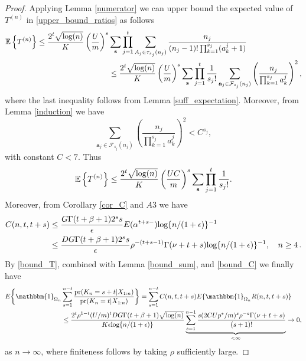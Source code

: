 \documentclass[12pt]{article}
\def\log{\hbox{log}}
\begin{document}
\begin{proof}
Applying Lemma \ref{numerator} we can upper bound the expected value of $T^{(n)}$ in \eqref{upper_bound_ratios} as follows
\[
\begin{aligned}
\mathbb{E}\left\{T^{(n)}\right\} \leq \frac{2^t\sqrt{\log(n)}}{K}\left(\frac{U}{m}\right)^s&\sum_{\textbf{s}}\prod_{j = 1}^t\sum_{A_j \in \tau_{s_j}(n_j)}\frac{n_j}{(n_j-1)!\prod_{k = 1}^{s_j}(a^j_k+1)}\\
& \leq \frac{2^t\sqrt{\log(n)}}{K}\left(\frac{U}{m}\right)^s\sum_{\textbf{s}}\prod_{j = 1}^t\frac{1}{s_j!}\sum_{\textbf{a}_j \in \mathcal{F}_{s_j}(n_j)}\left(\frac{n_j}{\prod_{k = 1}^{s_j}a^j_k}\right)^2,
\end{aligned}
\]
where the last inequality follows from Lemma \ref{suff_expectation}. Moreover, from Lemma \ref{induction} we have
\[
\sum_{\textbf{a}_j \in \mathcal{F}_{s_j}(n_j)}\left(\frac{n_j}{\prod_{k = 1}^{s_j}a^j_k}\right)^2 < C^{s_j},
\]
with constant $C < 7$. Thus
\begin{equation}\label{bound_T}
\mathbb{E}\left\{T^{(n)}\right\} \leq \frac{2^t\sqrt{\log(n)}}{K}\left(\frac{UC}{m}\right)^s\sum_{\textbf{s}}\prod_{j = 1}^t\frac{1}{s_j!}.
\end{equation}
Moreover, from Corollary \ref{cor_C} and $A3$ we have
\begin{equation}\label{bound_C}
\begin{aligned}
C(n,t,t+s) &\leq \frac{G\Gamma(t+\beta+1)2^ss}{\epsilon}E(\alpha^{t+s-})\log\{n/(1+\epsilon)\}^{-1} \\
& \leq \frac{DG\Gamma(t+\beta+1)2^ss}{\epsilon}\rho^{-(t+s-1)}\Gamma(\nu+t+s)\log\{n/(1+\epsilon)\}^{-1}, \quad n \geq 4\,.
\end{aligned}
\end{equation}
By \eqref{bound_T}, combined with Lemma \ref{bound_sum}, and \eqref{bound_C} we finally have
\[
\begin{aligned}
E \biggl\{\mathbbm{1}_{\Omega_n}&\sum_{s = 1}^{n-t}\frac{\text{pr}(K_n = s+t | X_{1:n})}{\text{pr}(K_n = t | X_{1:n})}\biggr\} = \sum_{s = 1}^{n-t}C(n,t,t+s)E\{\mathbbm{1}_{\Omega_n}R(n,t,t+s)\}\\
&  \leq \frac{2^t\rho^{1-t}(U/m)^tDG\Gamma(t+\beta+1)\sqrt{\log(n)}}{K\epsilon \log\{n/(1+\epsilon)\}}\underbrace{\sum_{ s = 1}^{n-1}\frac{s (2CUp^*/m)^{s}\rho^{-s}\Gamma(\nu +t+s)}{(s+1)!}}_{< \infty} \to 0,
\end{aligned}
\]
as $n \to \infty$, where finiteness follows by taking $\rho$ sufficiently large.
\end{proof}
\end{document}
